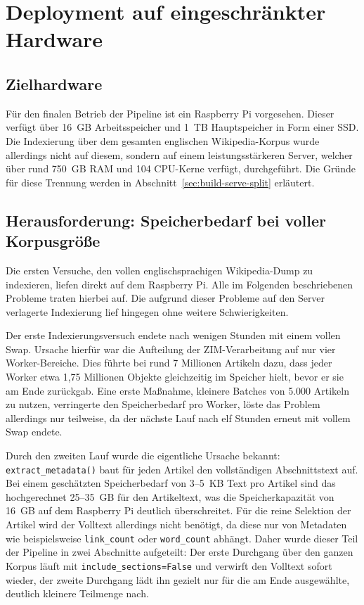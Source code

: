 \chapter{Deployment auf eingeschränkter Hardware}
\label{ch:deployment}

\section{Zielhardware}
Für den finalen Betrieb der Pipeline ist ein Raspberry Pi vorgesehen. Dieser verfügt über 16~GB Arbeitsspeicher
und 1~TB Hauptspeicher in Form einer SSD. Die Indexierung über dem gesamten englischen Wikipedia-Korpus wurde allerdings
nicht auf diesem, sondern auf einem leistungsstärkeren Server, welcher über rund 750~GB RAM und 104 CPU-Kerne verfügt, durchgeführt.
Die Gründe für diese Trennung werden in Abschnitt~\ref{sec:build-serve-split} erläutert.

\section{Herausforderung: Speicherbedarf bei voller Korpusgröße}
\label{sec:speicherbedarf}

Die ersten Versuche, den vollen englischsprachigen Wikipedia-Dump zu indexieren, liefen direkt auf dem Raspberry Pi. Alle im Folgenden
beschriebenen Probleme traten hierbei auf. Die aufgrund dieser Probleme auf den Server verlagerte Indexierung lief hingegen
ohne weitere Schwierigkeiten.

Der erste Indexierungsversuch endete nach wenigen Stunden mit einem vollen Swap. Ursache hierfür war die Aufteilung der ZIM-Verarbeitung
auf nur vier Worker-Bereiche. Dies führte bei rund 7 Millionen Artikeln dazu, dass jeder Worker etwa 1,75 Millionen Objekte gleichzeitig im
Speicher hielt, bevor er sie am Ende zurückgab. Eine erste Maßnahme, kleinere Batches von 5.000 Artikeln zu nutzen, verringerte den
Speicherbedarf pro Worker, löste das Problem allerdings nur teilweise, da der nächste Lauf nach elf Stunden erneut mit vollem Swap endete.

Durch den zweiten Lauf wurde die eigentliche Ursache bekannt: \texttt{extract\_metadata()} baut für jeden Artikel den vollständigen Abschnittstext
auf. Bei einem geschätzten Speicherbedarf von 3--5~KB Text pro Artikel sind das hochgerechnet 25--35~GB für den Artikeltext,
was die Speicherkapazität von 16~GB auf dem Raspberry Pi deutlich überschreitet. Für die reine Selektion der Artikel wird der Volltext allerdings
nicht benötigt, da diese nur von Metadaten wie beispielsweise \texttt{link\_count} oder \texttt{word\_count} abhängt. Daher wurde dieser Teil der Pipeline in zwei 
Abschnitte aufgeteilt: Der erste Durchgang über den ganzen
Korpus läuft mit \texttt{include\_\allowbreak{}sections=False} und verwirft den Volltext sofort wieder, der zweite Durchgang lädt ihn gezielt nur
für die am Ende ausgewählte, deutlich kleinere Teilmenge nach.

